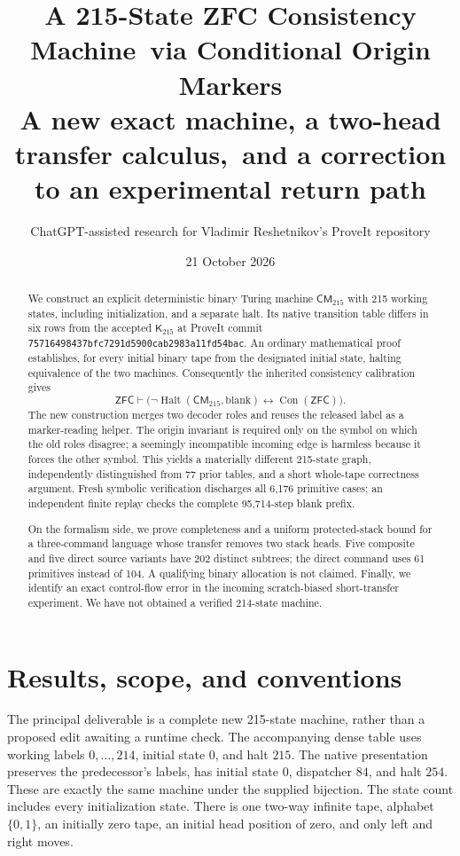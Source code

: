 \documentclass[11pt]{article}
\title{A 215-State ZFC Consistency Machine\ via Conditional Origin Markers\\[0.6em]\large A new exact machine, a two-head transfer calculus,\ and a correction to an experimental return path}
\author{ChatGPT-assisted research for Vladimir Reshetnikov's ProveIt repository}
\date{21 October 2026}
\theoremstyle{definition}\newtheorem{definition}[theorem]{Definition}
\theoremstyle{remark}\newtheorem{remark}[theorem]{Remark}
\newcommand{\Con}{\operatorname{Con}}
\newcommand{\Halt}{\operatorname{Halt}}
\newcommand{\ZFC}{\mathsf{ZFC}}
\newcommand{\Kold}{\mathsf{K}_{215}}
\newcommand{\Knew}{\mathsf{CM}_{215}}
\begin{document}
\maketitle
\begin{abstract}
We construct an explicit deterministic binary Turing machine $\Knew$ with
215 working states, including initialization, and a separate halt. Its
native transition table differs in six rows from the accepted $\Kold$ at
ProveIt commit \texttt{75716498437bfc7291d5900cab2983a11fd54bac}.
An ordinary mathematical proof establishes, for every initial binary tape
from the designated initial state, halting equivalence of the two machines.
Consequently the inherited consistency calibration gives
\[
 \ZFC\vdash\bigl(\neg\Halt(\Knew,\mathrm{blank})\leftrightarrow\Con(\ZFC)\bigr).
\]
The new construction merges two decoder roles and reuses the released label
as a marker-reading helper. The origin invariant is required only on the
symbol on which the old roles disagree; a seemingly incompatible incoming
edge is harmless because it forces the other symbol. This yields a
materially different 215-state graph, independently distinguished from
77 prior tables, and a short whole-tape correctness argument. Fresh
symbolic verification discharges all 6,176 primitive cases; an independent
finite replay checks the complete 95,714-step blank prefix.

On the formalism side, we prove completeness and a uniform protected-stack
bound for a three-command language whose transfer removes two stack heads.
Five composite and five direct source variants have 202 distinct subtrees;
the direct command uses 61 primitives instead of 104. A qualifying binary
allocation is not claimed. Finally, we identify an exact control-flow
error in the incoming scratch-biased short-transfer experiment. We have not
obtained a verified 214-state machine.
\end{abstract}
\newpage
\tableofcontents
\newpage

\section{Results, scope, and conventions}

The principal deliverable is a complete new 215-state machine, rather than
a proposed edit awaiting a runtime check. The accompanying dense table uses
working labels $0,\ldots,214$, initial state $0$, and halt $215$. The native
presentation preserves the predecessor's labels, has initial state $0$,
dispatcher $84$, and halt $254$. These are exactly the same machine under
the supplied bijection. The state count includes every initialization state.
There is one two-way infinite tape, alphabet $\{0,1\}$, an initially zero
tape, an initial head position of zero, and only left and right moves.
\end{document}
